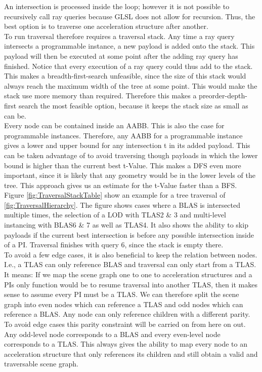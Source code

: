 \newpage
An intersection is processed inside the loop; however it is not possible to recursively call ray queries because GLSL does not allow for recursion. Thus, the best option is to traverse one acceleration structure after another.\\
To run traversal therefore requires a traversal stack. Any time a ray query intersects a programmable instance, a new payload is added onto the stack. This payload will then be executed at some point after the adding ray query has finished. Notice that every execution of a ray query could thus add to the stack. This makes a breadth-first-search unfeasible, since the size of this stack would always reach the maximum width of the tree at some point. This would make the stack use more memory than required. Therefore this makes a preorder-depth-first search the most feasible option, because it keeps the stack size as small as can be.\\
Every node can be contained inside an AABB. This is also the case for programmable instances. Therefore, any AABB for a programmable instance gives a lower and upper bound for any intersection t in its added payload. This can be taken advantage of to avoid traversing though payloads in which the lower bound is higher than the current best t-Value. This makes a DFS even more important, since it is likely that any geometry would be in the lower levels of the tree. This approach gives us an estimate for the t-Value faster than a BFS. Figure \ref{fig:TraversalStackTable} show an example for a tree traversal of \ref{fig:TraversalHierarchy}. The figure shows cases where a BLAS is intersected multiple times, the selection of a LOD with TLAS2 \& 3 and multi-level instancing with BLAS6 \& 7 as well as TLAS4. It also shows the ability to skip payloads if the current best intersection is before any possible intersection inside of a PI. Traversal finishes with query 6, since the stack is empty there.\\
To avoid a few edge cases, it is also beneficial to keep the relation between nodes. I.e., a TLAS can only reference BLAS and traversal can only start from a TLAS. It means: If we map the scene graph one to one to acceleration structures and a PIs only function would be to resume traversal into another TLAS, then it makes sense to assume every PI must be a TLAS. We can therefore split the scene graph into even nodes which can reference a TLAS and odd nodes which can reference a BLAS. Any node can only reference children with a different parity. To avoid edge cases this parity constraint will be carried on from here on out. Any odd-level node corresponds to a BLAS and every even-level node corresponds to a TLAS. This always gives the ability to map every node to an acceleration structure that only references its children and still obtain a valid and traversable scene graph.
